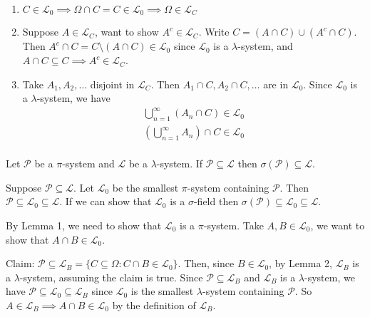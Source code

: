 \documentclass[class=article,crop=false]{standalone}
\begin{document}
\begin{prf}
\begin{enumerate}[label=(\roman*)]
	\item $ C \in \mathcal{L}_0 \implies \Omega \cap C = C \in \mathcal{L}_0 \implies \Omega \in \mathcal{L}_C$ 
	\item Suppose $ A \in \mathcal{L}_C$, want to show $ A^{c} \in \mathcal{L}_C$. Write $ C = (A \cap C) \cup (A^{c} \cap  C)$. Then $ A^{c} \cap  C = C \setminus (A \cap C) \in \mathcal{L}_0$ since $ \mathcal{L}_0$ is a $\lambda$-system, and $ A \cap C \subseteq C \implies A^{c} \in \mathcal{L}_C$.
	\item Take $ A_1,A_2,\ldots$ disjoint in $ \mathcal{L}_C$. Then $A_1 \cap  C, A_2 \cap C,\ldots$ are in $ \mathcal{L}_0$. Since $ \mathcal{L}_0$ is a $\lambda$-system, we have
		\begin{align*}
			\bigcup_{ n =1}^{\infty} (A_n \cap  C) \in \mathcal{L}_0\\
			\left( \bigcup_{ n =1}^{\infty} A_n \right) \cap C \in \mathcal{L}_0\\
		\end{align*}
\end{enumerate}
\end{prf}

\begin{thm}
	Let $ \mathcal{ P}$ be a $\pi$-system and $ \mathcal{L}$ be a $\lambda$-system. If $ \mathcal{ P} \subseteq \mathcal{L}$ then $ \sigma( \mathcal{ P}) \subseteq \mathcal{L}$.
\end{thm}

\begin{prf}
	Suppose $ \mathcal{ P} \subseteq \mathcal{L}$. Let $ \mathcal{L}_0$ be the smallest $\pi$-system containing $ \mathcal{ P}$. Then $ \mathcal{ P} \subseteq \mathcal{L}_0 \subseteq \mathcal{L}$. If we can show that $ \mathcal{L}_0$ is a $\sigma$-field then $ \sigma( \mathcal{ P}) \subseteq \mathcal{L}_0 \subseteq \mathcal{L}$.

	By Lemma 1, we need to show that $ \mathcal{L}_0$ is a $\pi$-system. Take $ A,B \in \mathcal{L}_0$, we want to show that $ A \cap B \in \mathcal{L}_0$.

	Claim: $ \mathcal{ P} \subseteq \mathcal{L}_B = \{C \subseteq \Omega: C \cap B \in \mathcal{L}_0\} $.
	Then, since $ B \in \mathcal{L}_0$, by Lemma 2, $ \mathcal{L}_B$ is a $\lambda$-system, assuming the claim is true. Since $ \mathcal{ P} \subseteq \mathcal{L}_B$ and $ \mathcal{L}_B$ is a $\lambda$-system, we have $ \mathcal{ P} \subseteq \mathcal{L}_0 \subseteq \mathcal{L}_B$ since $ \mathcal{L}_0$ is the smallest $\lambda$-system containing $ \mathcal{ P}$. So $ A \in \mathcal{L}_B \implies A \cap B \in \mathcal{L}_0$ by the definition of $ \mathcal{L}_B$.
\end{prf}
\end{document}
